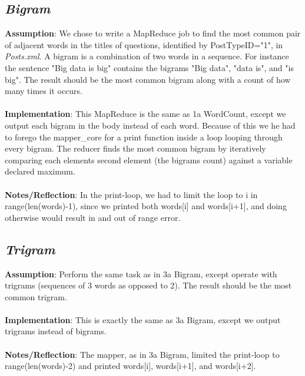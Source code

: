 \documentclass[fleqn,10pt]{wlscirep}
\begin{document}
\subsection{\emph{Bigram}}
\textbf{Assumption}: We chose to write a MapReduce job to find the most common pair of adjacent words in the titles of questions, identified by PostTypeID="1", in \textit{Posts.xml}. A bigram is a combination of two words in a sequence. For instance the sentence "Big data is big" contains the bigrams "Big data", "data is", and "is big". The result should be the most common bigram along with a count of how many times it occurs. \\ \\
\textbf{Implementation}: This MapReduce is the same as 1a WordCount, except we output each bigram in the body instead of each word. Because of this we he had to forego the mapper\_core for a print function inside a loop looping through every bigram. The reducer finds the most common bigram by iteratively comparing each elements second element (the bigrams count) against a variable declared maximum. \\ \\
\textbf{Notes/Reflection}: In the print-loop, we had to limit the loop to i in range(len(words)-1), since we printed both words[i] and words[i+1], and doing otherwise would result in and out of range error.


\subsection{\emph{Trigram}}
\textbf{Assumption}: Perform the same task as in 3a Bigram, except operate with trigrams (sequences of 3 words as opposed to 2). The result should be the most common trigram. \\ \\
\textbf{Implementation}: This is exactly the same as 3a Bigram, except we output trigrams instead of bigrams. \\ \\
\textbf{Notes/Reflection}: The mapper, as in 3a Bigram, limited the print-loop to range(len(words)-2) and printed words[i], words[i+1], and words[i+2].

\end{document}
